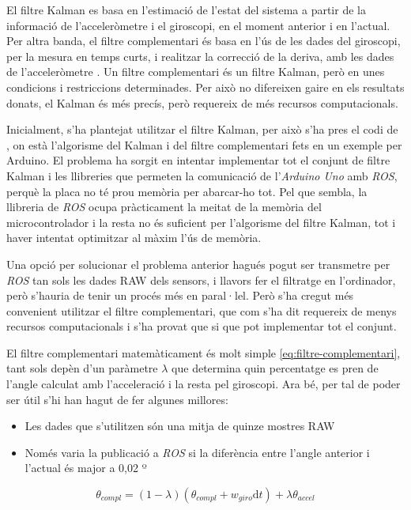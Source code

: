\documentclass[12pt,a4paper,final,twoside]{article}
\begin{document}
El filtre Kalman es basa en l'estimació de l'estat del sistema a partir de la informació de l'acceleròmetre i el giroscopi, en el moment anterior i en l'actual. Per altra banda, el filtre complementari és basa en l'ús de les dades del giroscopi, per la mesura en temps curts, i realitzar la correcció de la deriva, amb les dades de l'acceleròmetre \cite{Gaydou2011}. Un filtre complementari és un filtre Kalman, però en unes condicions i restriccions determinades. Per això no difereixen gaire en els resultats donats, el Kalman és més precís, però requereix de més recursos computacionals.

Inicialment, s'ha plantejat utilitzar el filtre Kalman, per això s'ha pres el codi de \cite{Lauszus2012}, on està l'algorisme del Kalman i del filtre complementari fets en un exemple per Arduino. El problema ha sorgit en intentar implementar tot el conjunt de filtre Kalman i les llibreries que permeten la comunicació de l'\textit{Arduino Uno} amb \textit{ROS}, perquè la placa no té prou memòria per abarcar-ho tot. Pel que sembla, la llibreria de \textit{ROS} ocupa pràcticament la meitat de la memòria del microcontrolador i la resta no és suficient per l'algorisme del filtre Kalman, tot i haver intentat optimitzar al màxim l'ús de memòria.

Una opció per solucionar el problema anterior hagués pogut ser transmetre per \textit{ROS} tan sols les dades RAW dels sensors, i llavors fer el filtratge en l'ordinador, però s'hauria de tenir un procés més en paral·lel. Però s'ha cregut més convenient utilitzar el filtre complementari, que com s'ha dit requereix de menys recursos computacionals i s'ha provat que si que pot implementar tot el conjunt.

El filtre complementari matemàticament és molt simple \eqref{eq:filtre-complementari}, tant sols depèn d'un paràmetre $\lambda$ que determina quin percentatge es pren de l'angle calculat amb l'acceleració i la resta pel giroscopi. Ara bé, per tal de poder ser útil s'hi han hagut de fer algunes millores:

\begin{itemize}
\item Les dades que s'utilitzen són una mitja de quinze mostres RAW
\item Només varia la publicació a \textit{ROS} si la diferència entre l'angle anterior i l'actual és major a 0,02 º
\end{itemize}

\begin{equation} 
\theta_{compl} = (1 - \lambda)(\theta_{compl} + w_{giro}\mathrm{d}t) + \lambda \theta_{accel} \label{eq:filtre-complementari}
\end{equation}
\end{document}
